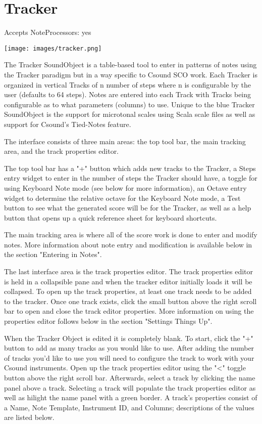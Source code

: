 \section{Tracker}\label{tracker}

Accepts NoteProcessors: yes

\texttt{[image: images/tracker.png]}

The Tracker SoundObject is a table-based tool to enter in patterns of
notes using the Tracker paradigm but in a way specific to Csound SCO
work. Each Tracker is organized in vertical Tracks of n number of steps
where n is configurable by the user (defaults to 64 steps). Notes are
entered into each Track with Tracks being configurable as to what
parameters (columns) to use. Unique to the blue Tracker SoundObject is
the support for microtonal scales using Scala scale files as well as
support for Csound's Tied-Notes feature.

The interface consists of three main areas: the top tool bar, the main
tracking area, and the track properties editor.

The top tool bar has a "+" button which adds new tracks to the Tracker,
a Steps entry widget to enter in the number of steps the Tracker should
have, a toggle for using Keyboard Note mode (see below for more
information), an Octave entry widget to determine the relative octave
for the Keyboard Note mode, a Test button to see what the generated
score will be for the Tracker, as well as a help button that opens up a
quick reference sheet for keyboard shortcuts.

The main tracking area is where all of the score work is done to enter
and modify notes. More information about note entry and modification is
available below in the section "Entering in Notes".

The last interface area is the track properties editor. The track
properties editor is held in a collapsible pane and when the tracker
editor initially loads it will be collapsed. To open up the track
properties, at least one track needs to be added to the tracker. Once
one track exists, click the small button above the right scroll bar to
open and close the track editor properties. More information on using
the properties editor follows below in the section "Settings Things Up".

When the Tracker Object is edited it is completely blank. To start,
click the "+" button to add as many tracks as you would like to use.
After adding the number of tracks you'd like to use you will need to
configure the track to work with your Csound instruments. Open up the
track properties editor using the "\textless{}" toggle button above the
right scroll bar. Afterwards, select a track by clicking the name panel
above a track. Selecting a track will populate the track properties
editor as well as hilight the name panel with a green border. A track's
properties consist of a Name, Note Template, Instrument ID, and Columns;
descriptions of the values are listed below.

